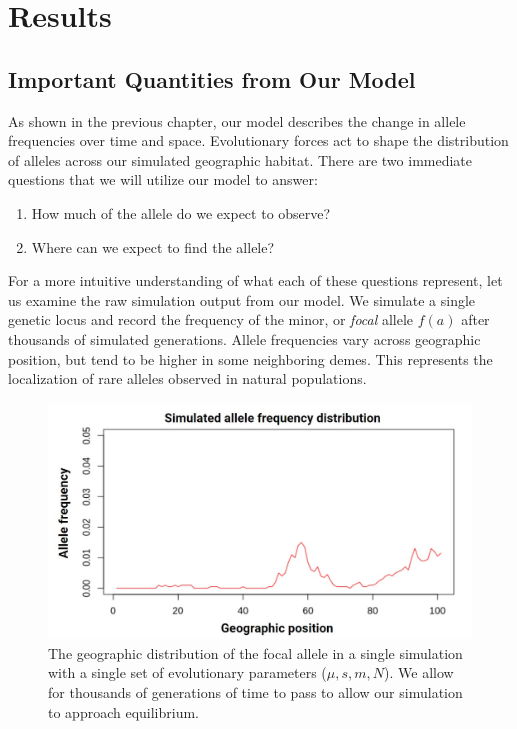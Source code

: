 \chapter{Results}
\section{Important Quantities from Our Model}
As shown in the previous chapter, our model describes the change in allele frequencies over time and space. Evolutionary forces act to shape the distribution of alleles across our simulated geographic habitat. There are two immediate questions that we will utilize our model to answer:

\begin{enumerate}
    \item How much of the allele do we expect to observe?
    \item Where can we expect to find the allele?
\end{enumerate}


For a more intuitive understanding of what each of these questions represent, let us examine the raw simulation output from our model. We simulate a single genetic locus and record the frequency of the minor, or \textit{focal} allele $f(a)$ after thousands of simulated generations. Allele frequencies vary across geographic position, but tend to be higher in some neighboring demes. This represents the localization of rare alleles observed in natural populations. \cite{1000_genomes} \cite{geerlings_2018} \cite{novembre_marcus_2017} 


\begin{figure}[h]
    \centering
    \includegraphics[scale=0.4]{img/geographic_distribution.JPG}
    \caption{The geographic distribution of the focal allele in a single simulation with a single set of evolutionary parameters ($\mu,s,m,N$). We allow for thousands of generations of time to pass to allow our simulation to approach equilibrium.}
    \label{fig:geog_sim}
\end{figure}


